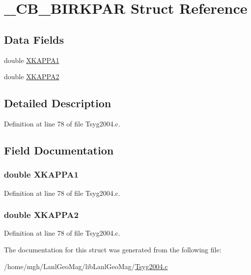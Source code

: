 \hypertarget{struct___c_b___b_i_r_k_p_a_r}{
\section{\_\-CB\_\-BIRKPAR Struct Reference}
\label{struct___c_b___b_i_r_k_p_a_r}
}
\subsection*{Data Fields}
\begin{CompactItemize}
\item 
double \hyperlink{struct___c_b___b_i_r_k_p_a_r_09d632f8debd75ca49c99493f5f7be3d}{XKAPPA1}
\item 
double \hyperlink{struct___c_b___b_i_r_k_p_a_r_7939266cf05911b5c6f6e46e4e09e87c}{XKAPPA2}
\end{CompactItemize}


\subsection{Detailed Description}


Definition at line 78 of file Tsyg2004.c.

\subsection{Field Documentation}
\hypertarget{struct___c_b___b_i_r_k_p_a_r_09d632f8debd75ca49c99493f5f7be3d}{
\subsubsection[{XKAPPA1}]{\setlength{\rightskip}{0pt plus 5cm}double {\bf XKAPPA1}}}
\label{struct___c_b___b_i_r_k_p_a_r_09d632f8debd75ca49c99493f5f7be3d}




Definition at line 78 of file Tsyg2004.c.\hypertarget{struct___c_b___b_i_r_k_p_a_r_7939266cf05911b5c6f6e46e4e09e87c}{
\subsubsection[{XKAPPA2}]{\setlength{\rightskip}{0pt plus 5cm}double {\bf XKAPPA2}}}
\label{struct___c_b___b_i_r_k_p_a_r_7939266cf05911b5c6f6e46e4e09e87c}




Definition at line 78 of file Tsyg2004.c.

The documentation for this struct was generated from the following file:\begin{CompactItemize}
\item 
/home/mgh/LanlGeoMag/libLanlGeoMag/\hyperlink{_tsyg2004_8c}{Tsyg2004.c}\end{CompactItemize}
